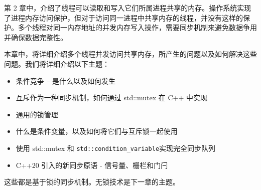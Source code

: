第 2 章中，介绍了线程可以读取和写入它们所属进程共享的内存。操作系统实现了进程内存访问保护，但对于访问同一进程中共享内存的线程，并没有这样的保护。多个线程对同一内存地址的并发内存写入操作，需要同步机制来避免数据争用并确保数据完整性。

本章中，将详细介绍多个线程并发访问共享内存，所产生的问题以及如何解决这些问题。我们将详细介绍以下主题：

\begin{itemize}
\item
条件竞争 – 是什么以及如何发生

\item
互斥作为一种同步机制，如何通过 std::mutex 在 C++ 中实现

\item
通用的锁管理

\item
什么是条件变量，以及如何将它们与互斥锁一起使用

\item
使用 std::mutex 和 \verb|std::condition_variable|实现完全同步队列

\item
C++20 引入的新同步原语 - 信号量、栅栏和门闩
\end{itemize}

这些都是基于锁的同步机制。无锁技术是下一章的主题。
